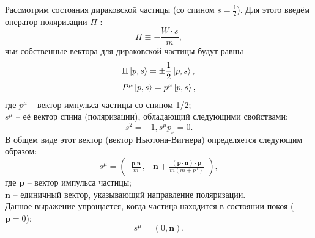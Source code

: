 \documentclass{extreport}
\begin{document}
Рассмотрим состояния дираковской частицы (со спином $s=\frac{1}{2}$). Для этого введём оператор поляризации $\Pi$ \cite{Barone_2002}:
\begin{equation}
	\Pi \equiv - \frac{W \cdot s}{m},
\end{equation}
чьи собственные вектора для дираковской частицы будут равны
\begin{equation}
	\begin{split}
		& \Pi \ket{p, s} = \pm \frac{1}{2} \ket{p, s}, \\
		& P^\mu \ket{p, s} = p^\mu \ket{p, s},
	\end{split}
\end{equation}
где $p^\mu$ -- вектор импульса частицы со спином 1/2; \\ $s^\mu$ -- её вектор спина (поляризации), обладающий следующими свойствами:
\begin{equation}
	s^2 = -1, s^\mu p_\nu = 0.
\end{equation}
В общем виде этот вектор (вектор Ньютона-Вигнера) определяется следующим образом:
\begin{equation}
	s^\mu = \begin{pmatrix}
		\frac{\textbf{p}\cdot \textbf{n}}{m}, & \textbf{n} + \frac{(\textbf{p}\cdot \textbf{n}) \cdot \textbf{p}}{m(m+p^0)}
	\end{pmatrix},
\end{equation}
где $\textbf{p}$ -- вектор импульса частицы; \\ $\textbf{n}$ -- единичный вектор, указывающий направление поляризации. \\ Данное выражение упрощается, когда частица находится в состоянии покоя ($\textbf{p} = 0$):
\begin{equation}
	s^\mu = (0, \textbf{n}).
\end{equation}
\end{document}
